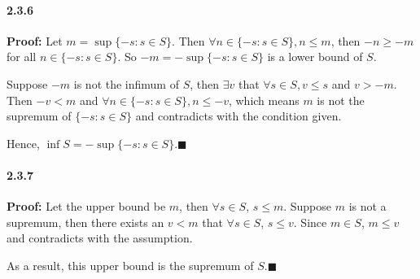\documentclass[11pt]{article}
\begin{document}
	\paragraph{2.3.6}\textbf{Proof:}
		Let $m = \sup \{-s : s \in S\}$. Then $\forall n \in \{-s : s \in S\}, n \leq m$, then $-n \geq -m$ for all $n \in \{-s : s \in S\}$. So $-m = -\sup\{-s : s \in S\}$ is a lower bound of $S$.
		
		Suppose $-m$ is not the infimum of $S$, then $\exists v$ that $\forall s \in S, v \leq s$ and $v > -m$. Then $-v < m$ and $\forall n \in \{-s : s \in S\}, n \leq -v$, which means $m$ is not the supremum of $\{-s : s \in S\}$ and contradicts with the condition given.
		
		Hence, $\inf S = -\sup \{-s : s \in S\}$.$\blacksquare$
	\paragraph{2.3.7}\textbf{Proof:} Let the upper bound be $m$, then $\forall s \in S$, $s \leq m$. Suppose $m$ is not a supremum, then there exists an $v < m$ that $\forall s \in S$, $s \leq v$. Since $m \in S$, $m \leq v$ and contradicts with the assumption.
	
	As a result, this upper bound is the supremum of $S$.$\blacksquare$
\end{document}
